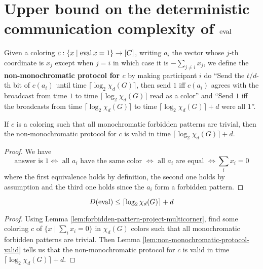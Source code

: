\chapter{Upper bound on the deterministic communication complexity of \texorpdfstring{$\operatorname{eval}$}{eval}}

\begin{definition}
  \label{def:non-monochromatic-protocol}

  Given a coloring $c : \{x \mid \operatorname{eval} x = 1\} \to [C]$, writing $a_i$ the vector whose $j$-th coordinate is $x_j$ except when $j = i$ in which case it is $-\sum_{j \ne i} x_j$, we define the {\bf non-monochromatic protocol for $c$} by making participant $i$ do ``Send the $t / d$-th bit of $c(a_i)$ until time $\lceil\log_2\chi_d(G)\rceil$, then send $1$ iff $c(a_i)$ agrees with the broadcast from time $1$ to time $\lceil\log_2\chi_d(G)\rceil$ read as a color'' and ``Send $1$ iff the broadcasts from time $\lceil\log_2\chi_d(G)\rceil$ to time $\lceil\log_2\chi_d(G)\rceil + d$ were all $1$''.
\end{definition}

\begin{lemma}
  \label{lem:non-monochromatic-protocol-valid}

  If $c$ is a coloring such that all monochromatic forbidden patterns are trivial, then the non-monochromatic protocol for $c$ is valid in time $\lceil\log_2\chi_d(G)\rceil + d$.
\end{lemma}
\begin{proof}
  \uses{}

  We have
  $$\text{answer is } 1 \iff \text{ all $a_i$ have the same color } \iff \text{ all $a_i$ are equal } \iff \sum_i x_i = 0$$
  where the first equivalence holds by definition, the second one holds by assumption and the third one holds since the $a_i$ form a forbidden pattern.
\end{proof}

\begin{theorem}
  \label{thm:det-fun-complex-eval-le-corner-color-num}

  $$D(\operatorname{eval}) \le \lceil\log_2\chi_d(G)\rceil + d$$
\end{theorem}
\begin{proof}

  Using Lemma \ref{lem:forbidden-pattern-project-multicorner}, find some coloring $c$ of $\{x \mid \sum_i x_i = 0\}$ in $\chi_d(G)$ colors such that all monochromatic forbidden patterns are trivial. Then Lemma \ref{lem:non-monochromatic-protocol-valid} tells us that the non-monochromatic protocol for $c$ is valid in time $\lceil\log_2\chi_d(G)\rceil + d$.
\end{proof}

